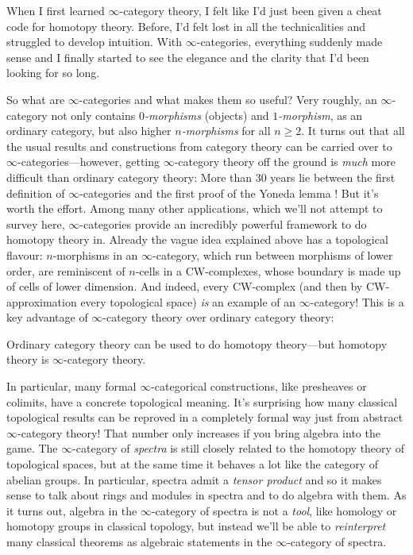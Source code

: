 \documentclass[DIV=12,numbers=enddot,leqno,bibliography=totoc]{scrartcl}
\begin{document}
	\begin{numpar}
		When I first learned $\infty$-category theory, I felt like I'd just been given a cheat code for homotopy theory. Before, I'd felt lost in all the technicalities and struggled to develop intuition. With $\infty$-categories, everything suddenly made sense and I finally started to see the elegance and the clarity that I'd been looking for so long.
		
		So what are $\infty$-categories and what makes them so useful? Very roughly, an $\infty$-category not only contains \emph{$0$-morphisms} (objects) and \emph{$1$-morphism}, as an ordinary category, but also higher \emph{$n$-morphisms} for all $n\geqslant 2$. It turns out that all the usual results and constructions from category theory can be carried over to $\infty$-categories---however, getting $\infty$-category theory off the ground is \emph{much} more difficult than ordinary category theory: More than 30 years lie between the first definition of $\infty$-categories \cite{BoardmanVogt} and the first proof of the Yoneda lemma \cite{HTT}! But it's worth the effort. Among many other applications, which we'll not attempt to survey here, $\infty$-categories provide an incredibly powerful framework to do homotopy theory in. Already the vague idea explained above has a topological flavour: $n$-morphisms in an $\infty$-category, which run between morphisms of lower order, are reminiscent of $n$-cells in a CW-complexes, whose boundary is made up of cells of lower dimension. And indeed, every CW-complex (and then by CW-approximation every topological space) \emph{is} an example of an $\infty$-category! This is a key advantage of $\infty$-category theory over ordinary category theory:
		\begin{alphanumerate}[label={}]\itshape
			\item Ordinary category theory can be used to do homotopy theory---but homotopy theory is \embrace{!} $\infty\text{-}$category theory.
		\end{alphanumerate}
		In particular, many formal $\infty$-categorical constructions, like presheaves or colimits, have a concrete topological meaning. It's surprising how many classical topological results can be reproved in a completely formal way just from abstract $\infty$-category theory! That number only increases if you bring algebra into the game. The $\infty$-category of \emph{spectra} is still closely related to the homotopy theory of topological spaces, but at the same time it behaves a lot like the category of abelian groups. In particular, spectra admit a \emph{tensor product} and so it makes sense to talk about rings and modules in spectra and to do algebra with them. As it turns out, algebra in the $\infty$-category of spectra is not a \emph{tool}, like homology or homotopy groups in classical topology, but instead we'll be able to \emph{reinterpret} many classical theorems as algebraic statements in the $\infty$-category of spectra.
		

\end{numpar}
\end{document}
